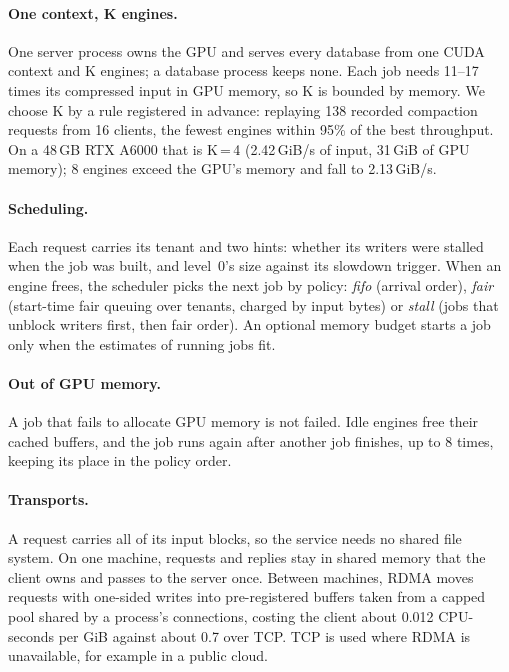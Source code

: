 \documentclass[sigconf, nonacm]{acmart}
\begin{document}
\paragraph{One context, K engines.} One server process owns the GPU and serves every database
from one CUDA context and K engines; a database process keeps none. Each job needs 11--17
times its compressed input in GPU memory, so K is bounded by memory. We choose K by a rule
registered in advance: replaying 138 recorded compaction requests from 16 clients, the
fewest engines within 95\% of the best throughput. On a 48\,GB RTX A6000 that is K\,=\,4
(2.42\,GiB/s of input, 31\,GiB of GPU memory); 8 engines exceed the GPU's memory and fall to
2.13\,GiB/s.

\paragraph{Scheduling.} Each request carries its tenant and two hints: whether its writers
were stalled when the job was built, and level~0's size against its slowdown trigger. When an
engine frees, the scheduler picks the next job by policy: \emph{fifo} (arrival order),
\emph{fair} (start-time fair queuing over tenants, charged by input bytes) or \emph{stall}
(jobs that unblock writers first, then fair order). An optional memory budget starts a job
only when the estimates of running jobs fit.

\paragraph{Out of GPU memory.} A job that fails to allocate GPU memory is not failed. Idle
engines free their cached buffers, and the job runs again after another job finishes, up to
8 times, keeping its place in the policy order.

\paragraph{Transports.} A request carries all of its input blocks, so the service needs no
shared file system. On one machine, requests and replies stay in shared memory that the client
owns and passes to the server once. Between machines, RDMA moves requests with one-sided
writes into pre-registered buffers taken from a capped pool shared by a process's
connections, costing the client about 0.012 CPU-seconds per GiB against about 0.7 over TCP.
TCP is used where RDMA is unavailable, for example in a public cloud.
\end{document}
